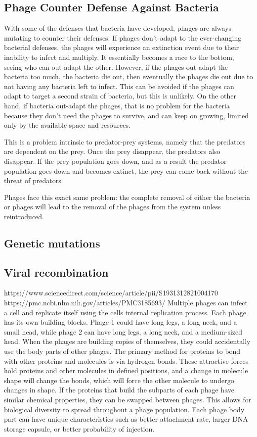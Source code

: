 \subsection{Phage Counter Defense Against Bacteria}
With some of the defenses that bacteria have developed, phages are always mutating to counter their defenses. 
If phages don't adapt to the ever-changing bacterial defenses, the phages will experience an extinction event due to their inability to infect and multiply. 
It essentially becomes a race to the bottom, seeing who can out-adapt the other. 
However, if the phages out-adapt the bacteria too much, the bacteria die out, then eventually the phages die out due to not having any bacteria left to infect. \newline
This can be avoided if the phages can adapt to target a second strain of bacteria, but this is unlikely. 
On the other hand, if bacteria out-adapt the phages, that is no problem for the bacteria because they don't need the phages to survive, and can keep on growing, limited only by the available space and resources. 

This is a problem intrinsic to predator-prey systems, namely that the predators are dependent on the prey. 
Once the prey disappear, the predators also disappear. 
If the prey population goes down, and as a result the predator population goes down and becomes extinct, the prey can come back without the threat of predators. 

Phages face this exact same problem: the complete removal of either the bacteria or phages will lead to the removal of the phages from the system unless reintroduced. 

\subsection{Genetic mutations}

\subsection{Viral recombination}
https://www.sciencedirect.com/science/article/pii/S1931312821004170
https://pmc.ncbi.nlm.nih.gov/articles/PMC3185693/
Multiple phages can infect a cell and replicate itself using the cells internal replication process. 
Each phage has its own building blocks. 
Phage 1 could have long legs, a long neck, and a small head, while phage 2 can have long legs, a long neck, and a medium-sized head. 
When the phages are building copies of themselves, they could accidentally use the body parts of other phages. 
The primary method for proteins to bond with other proteins and molecules is via hydrogen bonds. 
These attractive forces hold proteins and other molecules in defined positions, and a change in molecule shape will change the bonds, which will force the other molecule to undergo changes in shape. 
If the proteins that build the subparts of each phage have similar chemical properties, they can be swapped between phages. 
This allows for biological diversity to spread throughout a phage population. 
Each phage body part can have unique characteristics such as better attachment rate, larger DNA storage capsule, or better probability of injection. 

